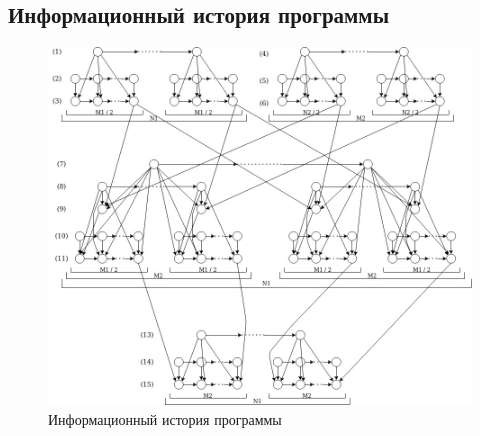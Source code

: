 \documentclass[a4paper, 12pt]{article}
\begin{document}
\subsection{Информационный история программы}
\begin{figure}[h!]
	\centering
	\includegraphics[scale=0.5]{inf_history}
	\caption{Информационный история программы}
\end{figure}
\end{document}
